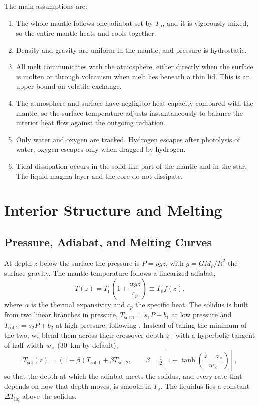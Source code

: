 \documentclass[11pt]{article}
\newcommand{\Tp}{T_\mathrm{p}}
\begin{document}
The main assumptions are:
\begin{enumerate}
\item The whole mantle follows one adiabat set by $\Tp$, and it is vigorously mixed, so the entire mantle heats and cools together.
\item Density and gravity are uniform in the mantle, and pressure is hydrostatic.
\item All melt communicates with the atmosphere, either directly when the surface is molten or through volcanism when melt lies beneath a thin lid. This is an upper bound on volatile exchange.
\item The atmosphere and surface have negligible heat capacity compared with the mantle, so the surface temperature adjusts instantaneously to balance the interior heat flow against the outgoing radiation.
\item Only water and oxygen are tracked. Hydrogen escapes after photolysis of water; oxygen escapes only when dragged by hydrogen.
\item Tidal dissipation occurs in the solid-like part of the mantle and in the star. The liquid magma layer and the core do not dissipate.
\end{enumerate}

\section{Interior Structure and Melting}\label{sec:interior}

\subsection{Pressure, Adiabat, and Melting Curves}

At depth $z$ below the surface the pressure is $P = \rho g z$, with $g = G M_p / R^2$ the surface gravity. The mantle temperature follows a linearized adiabat,
\begin{equation}
T(z) = \Tp \left( 1 + \frac{\alpha g z}{c_p} \right) \equiv \Tp f(z),
\label{eq:adiabat}
\end{equation}
where $\alpha$ is the thermal expansivity and $c_p$ the specific heat. The solidus is built from two linear branches in pressure, $T_{\mathrm{sol},1} = s_1 P + b_1$ at low pressure and $T_{\mathrm{sol},2} = s_2 P + b_2$ at high pressure, following \citet{Schaefer2016}. Instead of taking the minimum of the two, we blend them across their crossover depth $z_\times$ with a hyperbolic tangent of half-width $w_\times$ (30~km by default),
\begin{equation}
T_\mathrm{sol}(z) = (1 - \beta) T_{\mathrm{sol},1} + \beta T_{\mathrm{sol},2}, \qquad
\beta = \tfrac{1}{2}\left[1 + \tanh\left(\frac{z - z_\times}{w_\times}\right)\right],
\end{equation}
so that the depth at which the adiabat meets the solidus, and every rate that depends on how that depth moves, is smooth in $\Tp$. The liquidus lies a constant $\Delta T_\mathrm{liq}$ above the solidus.
\end{document}
